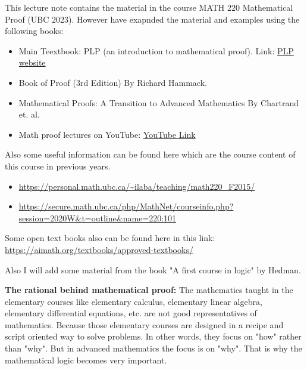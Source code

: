 \documentclass[10pt]{article}
\begin{document}

This lecture note contains the material in the course MATH 220 Mathematical Proof (UBC 2023). However have exapnded the material and examples using the following books:

\begin{itemize}
	\item Main Teextbook: PLP (an introduction to mathematical proof). Link: \href{https://personal.math.ubc.ca/~PLP/}{PLP website}
	\item Book of Proof (3rd Edition) By Richard Hammack.
	\item Mathematical Proofs: A Transition to Advanced Mathematics By Chartrand et. al.
	\item Math proof lectures on YouTube: \href{https://www.youtube.com/watch?v=UuETUEJo0rk&list=PL2419488168AE7001&index=1}{YouTube Link} 
\end{itemize}



Also some useful information can be found here which are the course content of this course in previous years.
\begin{itemize}
	\item \url{https://personal.math.ubc.ca/~ilaba/teaching/math220_F2015/}
	\item \url{https://secure.math.ubc.ca/php/MathNet/courseinfo.php?session=2020W&t=outline&name=220:101}
\end{itemize}


Some open text books also can be found here in this link: \url{https://aimath.org/textbooks/approved-textbooks/} \newline


Also I will add some material from the book "A first course in logic" by Hedman.


\textbf{The rational behind mathematical proof:} The mathematics taught in the elementary courses like elementary calculus, elementary linear algebra, elementary differential equations, etc. are not good representatives of mathematics. Because those elementary courses are designed in a recipe and script oriented way to solve problems. In other words, they focus on "how" rather than "why". But in advanced mathematics the focus is on "why". That is why the mathematical logic becomes very important.  


\newpage
\tableofcontents

\newpage

\newpage

\newpage

\newpage

\end{document}
